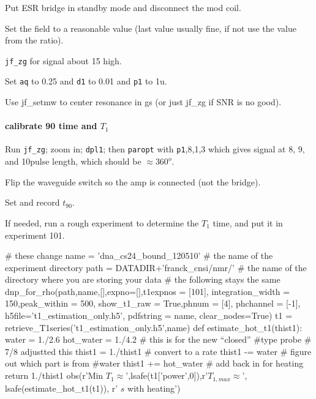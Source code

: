 
Put ESR bridge in standby mode and disconnect the mod coil.

Set the field to a reasonable value (last value usually fine, if not use the value from the ratio).

\texttt{jf\_zg} for signal about 15 high.

Set \texttt{aq} to 0.25 and \texttt{d1} to 0.01 and \texttt{p1} to 1u.

Use jf\_setmw to center resonance in gs (or just jf\_zg if SNR is no good).

\paragraph{calibrate 90 time and $T_1$}

Run \texttt{jf_zg}; zoom in; \texttt{dpl1}; then \texttt{paropt} with \texttt{p1},8,1,3 which gives signal at 8\us, 9\us, and 10\us pulse length, which should be $\approx 360^o$.

Flip the waveguide switch so the amp is connected (not the bridge).

Set and record $t_{90}$.

If needed, run a rough experiment to determine the $T_1$ time, and put it in experiment 101.

\begin{scriptsize}
\begin{python}[off]
# these change
name = 'dna_cs24_bound_120510' # the name of the experiment directory
path = DATADIR+'franck_cnsi/nmr/' # the name of the directory where you are storing your data
# the following stays the same
dnp_for_rho(path,name,[],expno=[],t1expnos = [101],
        integration_width = 150,peak_within = 500,
        show_t1_raw = True,phnum = [4],
        phchannel = [-1],
        h5file='t1_estimation_only.h5',
        pdfstring = name,
        clear_nodes=True)
t1 = retrieve_T1series('t1_estimation_only.h5',name)
def estimate_hot_t1(thist1):
    water = 1./2.6
    hot_water = 1./4.2 # this is for the new ``closed''
    #type probe # 7/8 adjustted this
    thist1 = 1./thist1 # convert to a rate
    thist1 -= water # figure out which part is from
    #water
    thist1 += hot_water # add back in for heating
    return 1./thist1
obs(r'Min $T_1\approx$',lsafe(t1['power',0]),r'\quad $T_{1,max}\approx$',
        lsafe(estimate_hot_t1(t1)),
        r' $s$ with heating')
\end{python}
\end{scriptsize}

